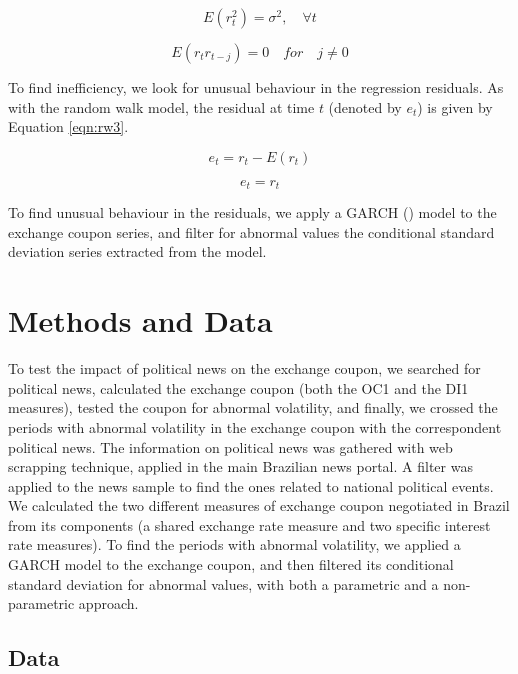 \documentclass[cic,tc, english]{iiufrgs}
\begin{document}
    \begin{equation}
        \label{eqn:wn2}
        E(r_t^2) = \sigma^2, \quad \forall t
    \end{equation}
    
    \begin{equation}
        \label{eqn:wn3}
        E(r_tr_{t-j}) = 0 \quad for \quad j \neq 0
    \end{equation}

    To find inefficiency, we look for unusual behaviour in the regression residuals. As with the random walk model, the residual at time $t$ (denoted by $e_t$) is given by Equation \ref{eqn:rw3}.

    $$e_t = r_t - E(r_t)$$

    \begin{equation}
        \label{eqn:rw3}
        e_t = r_t
    \end{equation}

    To find unusual behaviour in the residuals, we apply a GARCH (\citet{bollerslev1986}) model to the exchange coupon series, and filter for abnormal values the conditional standard deviation series extracted from the model.
    

\chapter{Methods and Data} \label{chapter_methods_data}

    To test the impact of political news on the exchange coupon, we searched for political news, calculated the exchange coupon (both the OC1 and the DI1 measures), tested the coupon for abnormal volatility, and finally, we crossed the periods with abnormal volatility in the exchange coupon with the correspondent political news. The information on political news was gathered with web scrapping technique, applied in the main Brazilian news portal. A filter was applied to the news sample to find the ones related to national political events. We calculated the two different measures of exchange coupon negotiated in Brazil from its components (a shared exchange rate measure and two specific interest rate measures). To find the periods with abnormal volatility, we applied a GARCH model to the exchange coupon, and then filtered its conditional standard deviation for abnormal values, with both a parametric and a non-parametric approach.

\section{Data} \label{chapter_data}
\end{document}
